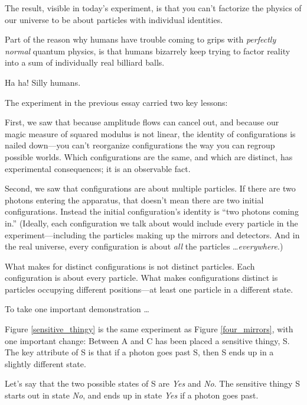 {
 The result, visible in today's experiment, is that
you can't factorize the physics of our universe to be
about particles with individual identities.}

{
 Part of the reason why humans have trouble coming to grips with
\textit{perfectly normal} quantum physics, is that humans bizarrely
keep trying to factor reality into a sum of individually real billiard
balls.}

{
 Ha ha! Silly humans.}

\myendsectiontext


{
 The experiment in the previous essay carried two key lessons: }

{
 First, we saw that because amplitude flows can cancel out, and
because our magic measure of squared modulus is not linear, the
identity of configurations is nailed down---you can't
reorganize configurations the way you can regroup possible worlds.
Which configurations are the same, and which are distinct, has
experimental consequences; it is an observable fact.}

{
 Second, we saw that configurations are about multiple particles.
If there are two photons entering the apparatus, that
doesn't mean there are two initial configurations.
Instead the initial configuration's identity is
``two photons coming in.'' (Ideally,
each configuration we talk about would include every particle in the
experiment---including the particles making up the mirrors and
detectors. And in the real universe, every configuration is about
\textit{all} the particles \ldots \textit{everywhere}.)}

{
 What makes for distinct configurations is not distinct particles.
Each configuration is about every particle. What makes configurations
distinct is particles occupying different positions---at least one
particle in a different state.}

{
 To take one important demonstration \ldots}


{
 Figure \ref{sensitive_thingy} is the same experiment as Figure \ref{four_mirrors}, with one
important change: Between A and C has been placed a sensitive thingy,
S. The key attribute of S is that if a photon goes past S, then S ends
up in a slightly different state.}

{
 Let's say that the two possible states of S are
\textit{Yes} and \textit{No}. The sensitive thingy S starts out in
state \textit{No}, and ends up in state \textit{Yes} if a photon goes
past.}

